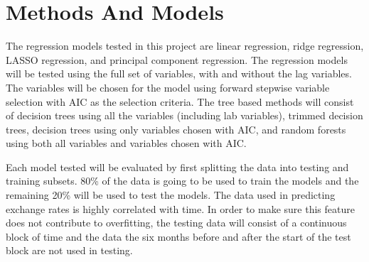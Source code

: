 \documentclass{sig-alternate-05-2015}
\begin{document}
\section{Methods And Models}
The regression models tested in this project are linear regression, ridge regression, LASSO regression, and principal component regression. The regression models will be tested using the full set of variables, with and without the lag variables. The variables will be chosen for the model using forward stepwise variable selection with AIC as the selection criteria. The tree based methods will consist of decision trees using all the variables (including lab variables), trimmed decision trees, decision trees using only variables chosen with AIC, and random forests using both all variables and variables chosen with AIC.     
\par{} Each model tested will be evaluated by first splitting the data into testing and training subsets. 80\% of the data is going to be used to train the models and the remaining 20\% will be used to test the models. The data used in predicting exchange rates is highly correlated with time. In order to  make sure this feature does not contribute to overfitting, the testing data will consist of a continuous block of time and the data the six months before and after the start of the test block are not used in testing.







     
\end{document}
